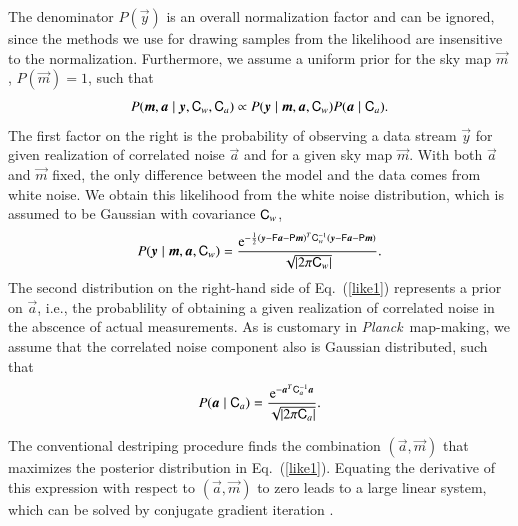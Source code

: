 \documentclass[twocolumn]{aa}
\newcommand{\ve}[1]{{\vec #1}}
\newcommand{\ma}[1]{\tens{#1}}
\newcommand{\pcal}{{P}}
\newcommand{\e}{\mathrm{e}}
\def\Planck{\textit{Planck}}
\begin{document}
The denominator $\pcal(\ve y)$ is an overall normalization factor and
can be ignored, since the methods we use for drawing samples from the
likelihood are insensitive to the normalization.  Furthermore, we assume a
uniform prior for the sky map $\ve m$, $\pcal(\ve m)=1$, such that
%
\begin{equation}
\pcal(\ve m,\ve a\mid \ve y, \ma C_w,\ma C_a) \propto
\pcal(\ve y \mid \ve m,\ve a, \ma C_w) \pcal(\ve a \mid \ma C_a). \label{like1}
\end{equation}
%
The first factor on the right is the probability of observing a data
stream $\ve y$ for given realization of correlated noise $\ve a$ and
for a given sky map $\ve m$.  With both $\ve a$ and $\ve m$ fixed, the
only difference between the model and the data comes from white noise.
We obtain this likelihood from the white noise distribution, which
is assumed to be Gaussian with covariance $\ma C_{w}$,
%
\begin{equation}
\pcal(\ve y \mid \ve m,\ve a, \ma C_w) =
\frac{\e^{-\frac12(\ve y - \ma{F}\ve{a} -\ma{P}\ve{m} )^T\ma{C}_w^{-1}
                 (\ve y - \ma{F}\ve{a} -\ma{P}\ve{m} ) }}{\sqrt{|2\pi\ma{C}_w|}}.
\end{equation}
%
The second distribution on the right-hand side of Eq.~(\ref{like1})
represents a prior on $\ve a$, i.e., the probablility of obtaining a
given realization of correlated noise in the abscence of actual
measurements.  As is customary in \Planck\ map-making, we assume that
the correlated noise component also is Gaussian distributed, such that
%
\begin{equation}
\pcal(\ve a \mid \ma C_a) = \frac{\e^{-\ve{a}^T\ma{C}_a^{-1}\ve
    a}}{\sqrt{|2\pi\ma{C}_a|}}.
\end{equation}
%

The conventional destriping procedure finds the combination $(\ve
a,\ve m)$ that maximizes the posterior distribution in
Eq.~(\ref{like1}).  Equating the derivative of this expression with
respect to $(\ve a,\ve m)$ to zero leads to a large linear system,
which can be solved by conjugate gradient iteration \citep[see, e.g.,][]{keihanen2010}.
\end{document}

